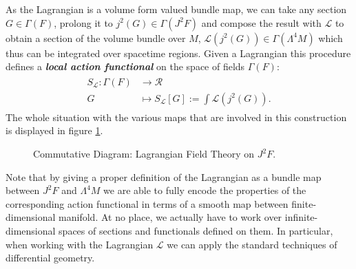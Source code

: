 As the Lagrangian is a volume form valued bundle map, we can take any section $G \in \Gamma(F)$, prolong it to $j^2(G) \in \Gamma(J^2F)$ and compose the result with $\mathcal{L}$ to obtain a section of the volume bundle over $M$, $\mathcal{L}(j^2(G)) \in \Gamma(\Lambda^4M)$ which thus can be integrated over spacetime regions. Given a Lagrangian this procedure defines a \textit{\textbf{local action functional}} on the space of fields $\Gamma(F)$:
\begin{align}
\begin{aligned}
    S_{\mathcal{L}} : \Gamma(F) &\longrightarrow \mathcal{R} \\
    G &\longmapsto S_{\mathcal{L}}[G] := \int \mathcal{L}(j^2(G)).
\end{aligned}
\end{align}
The whole situation with the various maps that are involved in this construction is displayed in figure \ref{diagram1}. 
\begin{figure}[hbt!]
\centering
{}
\caption{Commutative Diagram: Lagrangian Field Theory on $J^2F$.} \label{diagram1}
\end{figure}
Note that by giving a proper definition of the Lagrangian as a bundle map between $J^2F$ and $\Lambda^4M$ we are able to fully encode the properties of the corresponding action functional in terms of a smooth map between finite-dimensional manifold. At no place, we actually have to work over infinite-dimensional spaces of sections and functionals defined on them. In particular, when working with the Lagrangian $\mathcal{L}$ we can apply the standard techniques of differential geometry. 
